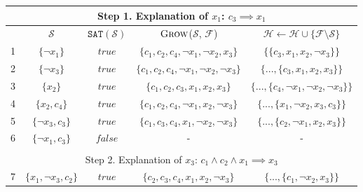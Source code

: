 \documentclass[twoside,11pt]{article}
\newcommand\m[1]{\mathcal{#1}}
\newcommand\setstohit{\ensuremath{\m{H} }\xspace}
\newcommand\formula{\ensuremath{\m{F} }\xspace}
\newcommand\mm[1]{\ensuremath{#1}\xspace}
\newcommand\call[1]{\mm{\textsc{#1}}}
\newcommand\sat{\texttt{{SAT}}\xspace}
\newcommand\grow{\mm{\call{Grow}}}
\begin{document}
\begin{table}[!h]
\centering
\begin{tabular}{lcccc} 
	\multicolumn{5}{c}{Step 1. Explanation of $x_1$: $c_3 \implies x_1$}\\
	\toprule[2pt]
	  & $\m{S}$                             & $\sat(\m{S})$    & \grow($\m{S}$, $\formula$)                                 & $\setstohit  \gets \setstohit  \cup \{  \formula \setminus \m{S}\}$ \\ 
	\toprule[2pt]
	1 & $\{ \lnot x_1\}$                    & $\mathit{true}$  & $\{c_1, c_2, c_4, \lnot x_1, \lnot x_2, x_3 \}$            & $\{ \{c_3, x_1, x_2, \lnot x_3 \}\}$                                \\
	\midrule	
	2 & $\{\lnot x_3\}$                     & $\mathit{true}$  & $\{c_1 , c_2 , c_4, \lnot x_1 , \lnot x_2 ,  \lnot x_3 \}$ & $\{ ..., \{c_3, x_1 , x_2 , x_3 \}\}$                               \\  
	\midrule
	3 & $\{x_2\}$                           & $\mathit{true}$  & $\{c_1 , c_2 , c_3, x_1 , x_2 , x_3 \}$                    & $\{ ..., \{c_4, \lnot x_1 , \lnot x_2 , \lnot x_3\} \}$             \\
	\midrule
	4 & $\{x_2, c_4\}$                      & $\mathit{true}$  & $\{  c_1 , c_2 , c_4, \lnot x_1 , x_2 , \lnot x_3\}$       & $\{ ..., \{x_1 , \lnot x_2 , x_3 , c_3 \}\}$                        \\
	\midrule
	5 & $\{\lnot x_3, c_3\}$                & $\mathit{true}$  & $\{   c_1  , c_3 , c_4, x_1, \lnot x_2 , \lnot x_3 \}$     & $\{ ...,  \{ c_2, \lnot x_1 , x_2 , x_3\}\}$                        \\
	\midrule
	6 & $\{\lnot x_1, c_3\}$                & $\mathit{false}$ & -                                                          & -                                                                   \\
	\\
	\multicolumn{5}{c}{Step 2. Explanation of $x_3$: $c_1 \wedge c_2 \wedge x_1 \implies x_3$}\\
	\toprule[2pt]
	7 & $\{x_1 , \lnot x_3 , c_2\}$         & $\mathit{true}$  & $\{   c_2 , c_3 , c_4,x_1 , x_2 , \lnot x_3 \}$            & $\{ ..., \{c_1, \lnot x_2 , x_3 \} \}$                              \\
	\midrule

\end{tabular}
\end{table}
\end{document}
